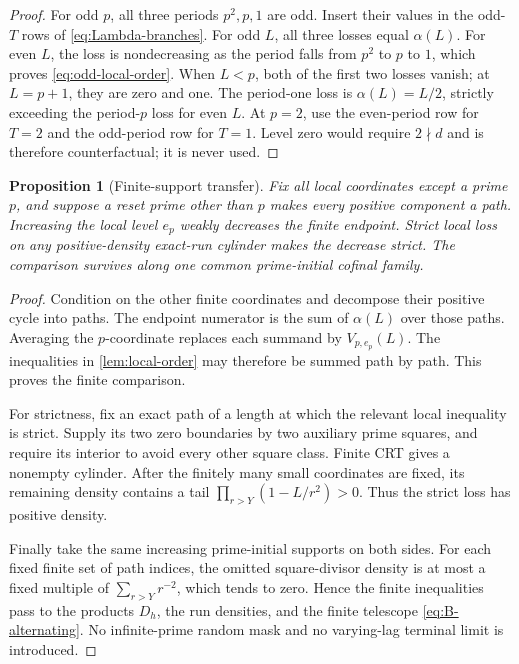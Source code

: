 \documentclass[12pt,a4paper]{article}
\newtheorem{proposition}[theorem]{Proposition}
\theoremstyle{definition}
\begin{document}
\begin{proof}
For odd \(p\), all three periods \(p^2,p,1\) are odd.  Insert their values in
the odd-\(T\) rows of \eqref{eq:Lambda-branches}.  For odd \(L\), all three
losses equal \(\alpha(L)\).  For even \(L\), the loss is nondecreasing as the
period falls from \(p^2\) to \(p\) to \(1\), which proves
\eqref{eq:odd-local-order}.  When \(L<p\), both of the first two losses vanish;
at \(L=p+1\), they are zero and one.  The period-one loss is
\(\alpha(L)=L/2\), strictly exceeding the period-\(p\) loss for even \(L\).
At \(p=2\), use the even-period row for \(T=2\) and the odd-period row for
\(T=1\).  Level zero would require \(2\nmid d\) and is therefore
counterfactual; it is never used.
\end{proof}

\begin{proposition}[Finite-support transfer]
\label{prop:transfer}
Fix all local coordinates except a prime \(p\), and suppose a reset prime
other than \(p\) makes every positive component a path.  Increasing the local
level \(e_p\) weakly decreases the finite endpoint.  Strict local loss on any
positive-density exact-run cylinder makes the decrease strict.  The comparison
survives along one common prime-initial cofinal family.
\end{proposition}

\begin{proof}
Condition on the other finite coordinates and decompose their positive cycle
into paths.  The endpoint numerator is the sum of \(\alpha(L)\) over those
paths.  Averaging the \(p\)-coordinate replaces each summand by
\(V_{p,e_p}(L)\).  The inequalities in \cref{lem:local-order} may therefore be
summed path by path.  This proves the finite comparison.

For strictness, fix an exact path of a length at which the relevant local
inequality is strict.  Supply its two zero boundaries by two auxiliary prime
squares, and require its interior to avoid every other square class.  Finite
CRT gives a nonempty cylinder.  After the finitely many small coordinates are
fixed, its remaining density contains a tail
\(\prod_{r>Y}(1-L/r^2)>0\).  Thus the strict loss has positive density.

Finally take the same increasing prime-initial supports on both sides.  For
each fixed finite set of path indices, the omitted square-divisor density is at
most a fixed multiple of \(\sum_{r>Y}r^{-2}\), which tends to zero.  Hence the
finite inequalities pass to the products \(D_h\), the run densities, and the
finite telescope \eqref{eq:B-alternating}.  No infinite-prime random mask and
no varying-lag terminal limit is introduced.
\end{proof}
\end{document}
